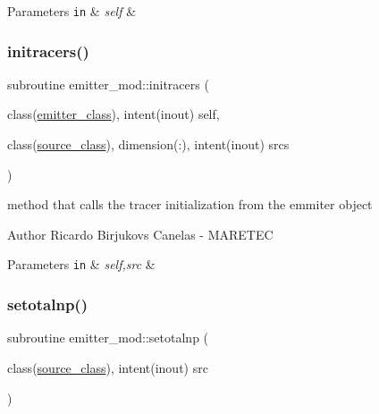 \begin{DoxyParams}[1]{Parameters}
\mbox{\tt in}  & {\em self} & \\
\hline
\end{DoxyParams}
\mbox{\label{namespaceemitter__mod_ad89dfc083eae7362441c353225a74ebc}} 
\subsubsection{\texorpdfstring{initracers()}{initracers()}}
{\footnotesize\ttfamily subroutine emitter\+\_\+mod\+::initracers (\begin{DoxyParamCaption}\item[{class(\hyperlink{structemitter__mod_1_1emitter__class}{emitter\+\_\+class}), intent(inout)}]{self,  }\item[{class(\hyperlink{structsources__mod_1_1source__class}{source\+\_\+class}), dimension(\+:), intent(inout)}]{srcs }\end{DoxyParamCaption})\hspace{0.3cm}{\ttfamily [private]}}



method that calls the tracer initialization from the emmiter object 

\begin{DoxyAuthor}{Author}
Ricardo Birjukovs Canelas -\/ M\+A\+R\+E\+T\+EC 
\end{DoxyAuthor}

\begin{DoxyParams}[1]{Parameters}
\mbox{\tt in}  & {\em self,src} & \\
\hline
\end{DoxyParams}
\mbox{\label{namespaceemitter__mod_a5c219dd6692a761ad4bf968ae750fcc6}} 
\subsubsection{\texorpdfstring{setotalnp()}{setotalnp()}}
{\footnotesize\ttfamily subroutine emitter\+\_\+mod\+::setotalnp (\begin{DoxyParamCaption}\item[{class(\hyperlink{structsources__mod_1_1source__class}{source\+\_\+class}), intent(inout)}]{src }\end{DoxyParamCaption})\hspace{0.3cm}{\ttfamily [private]}}



